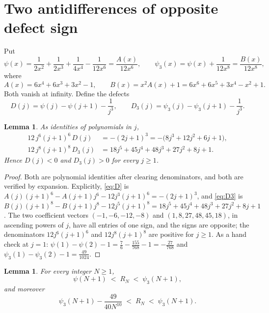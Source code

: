\documentclass[11pt]{amsart}
\newtheorem{lemma}[theorem]{Lemma}
\theoremstyle{definition}
\theoremstyle{remark}
\newcommand{\Rt}{R}
\newcommand{\ps}{\psi}
\newcommand{\pss}{\psi_3}
\begin{document}
\section{Two antidifferences of opposite defect sign}\label{sec:anti}

Put
\begin{equation}\label{eq:psi}
 \ps(x)=\frac1{2x^2}+\frac1{2x^3}+\frac1{4x^4}-\frac1{12x^6}
        =\frac{A(x)}{12x^{6}},
 \qquad
 \pss(x)=\ps(x)+\frac1{12x^8}=\frac{B(x)}{12x^{8}},
\end{equation}
where
\begin{equation}\label{eq:psi3}
 A(x)=6x^4+6x^3+3x^2-1,
 \qquad
 B(x)=x^2A(x)+1=6x^6+6x^5+3x^4-x^2+1.
\end{equation}
Both vanish at infinity. Define the defects
\[
 D(j)=\ps(j)-\ps(j+1)-\frac1{j^3},
 \qquad
 D_3(j)=\pss(j)-\pss(j+1)-\frac1{j^3}.
\]

\begin{lemma}\label{lem:signs}
As identities of polynomials in $j$,
\begin{align}
 12\,j^6(j+1)^6\,D(j)   &= -(2j+1)^3=-\bigl(8j^3+12j^2+6j+1\bigr),
 \label{eq:D}\\
 12\,j^8(j+1)^8\,D_3(j) &= 18j^5+45j^4+48j^3+27j^2+8j+1 .
 \label{eq:D3}
\end{align}
Hence $D(j)<0$ and $D_3(j)>0$ for every $j\ge1$.
\end{lemma}

\begin{proof}
Both are polynomial identities after clearing denominators, and both are
verified by expansion. Explicitly, \eqref{eq:D} is
$A(j)(j+1)^6-A(j+1)j^6-12j^3(j+1)^6=-(2j+1)^3$, and \eqref{eq:D3} is
$B(j)(j+1)^8-B(j+1)j^8-12j^5(j+1)^8=18j^5+45j^4+48j^3+27j^2+8j+1$. The two
coefficient vectors $(-1,-6,-12,-8)$ and $(1,8,27,48,45,18)$, in ascending
powers of $j$, have all entries of one sign, and the signs are opposite; the
denominators $12j^6(j+1)^6$ and $12j^8(j+1)^8$ are positive for $j\ge1$. As a
hand check at $j=1$: $\ps(1)-\ps(2)-1=\tfrac76-\tfrac{155}{768}-1=-\tfrac{27}{768}$
and $\pss(1)-\pss(2)-1=\tfrac{49}{1024}$.
\end{proof}

\begin{lemma}\label{lem:enclosure}
For every integer $N\ge1$,
\begin{equation}\label{eq:enc}
 \ps(N+1)\;<\;\Rt_N\;<\;\pss(N+1),
\end{equation}
and moreover
\begin{equation}\label{eq:enctight}
 \pss(N+1)-\frac{49}{40N^{10}}\;<\;\Rt_N\;<\;\pss(N+1).
\end{equation}
\end{lemma}
\end{document}
